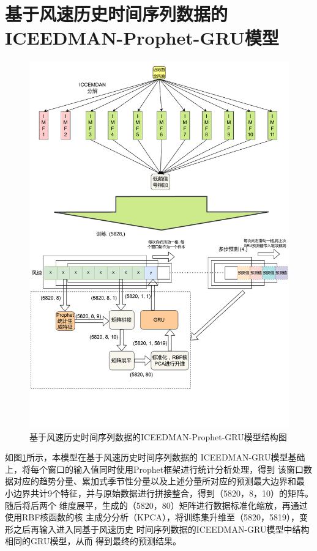 \documentclass[AutoFakeBold]{LZUThesis}
\begin{document}
\section{基于风速历史时间序列数据的ICEEDMAN-Prophet-GRU模型}
\begin{figure}[H]
	\centering
    \includegraphics[width=1\textwidth]{figures/ICCEMDAN-Prophet-GRU-Wind.pdf}
    \caption{基于风速历史时间序列数据的ICEEDMAN-Prophet-GRU模型结构图}
    \label{fig_ICCEMDAN_Prophet_GRU_Wind}
\end{figure}

如图\ref{fig_ICCEMDAN_Prophet_GRU_Wind}所示，本模型在基于风速历史时间序列数据的
ICEEDMAN-GRU模型基础上，将每个窗口的输入值同时使用Prophet框架进行统计分析处理，得到
该窗口数据对应的趋势分量、累加式季节性分量以及上述分量所对应的预测最大边界和最
小边界共计9个特征，并与原始数据进行拼接整合，得到（5820，8，10）的矩阵。随后将后两个
维度展平，生成的（5820，80）矩阵进行数据标准化缩放，再通过使用RBF核函数的核
主成分分析（KPCA），将训练集升维至（5820，5819），变形之后再输入进入同基于风速历史
时间序列数据的ICEEDMAN-GRU模型中结构相同的GRU模型，从而
得到最终的预测结果。
\end{document}
